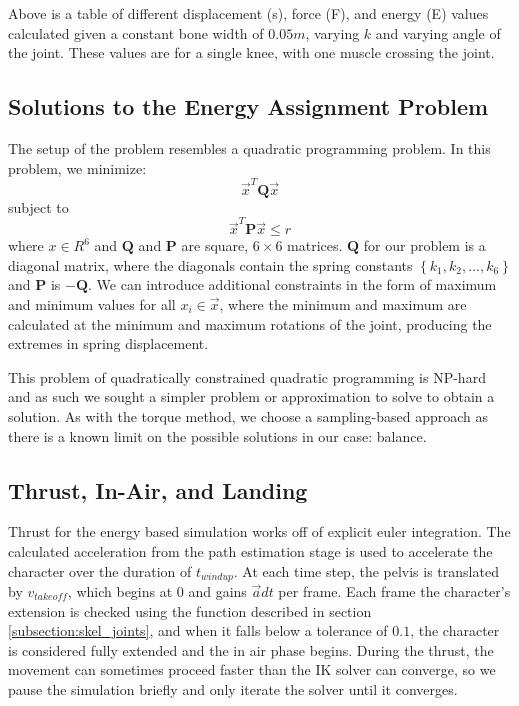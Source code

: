 \begin{table}[ht]
	\centering
	
	\caption[Table of estimated forces given $k$ values and joint angles]{Above is a table of different displacement (s), force (F), and energy (E) values calculated given a constant bone width of $0.05m$, varying $k$ and varying angle of the joint.  These values are for a single knee, with one muscle crossing the joint.}
	\label{tab:force_est}
\end{table}


\subsection{Solutions to the Energy Assignment Problem}
\label{subsection:energy_prob}
The setup of the problem resembles a quadratic programming problem.  In this problem, we minimize: \[ \vec{x}^T \mathbf{Q} \vec{x} \] subject to
\[ \vec{x}^T \mathbf{P} \vec{x} \le r \] where $x \in R^6$ and $\mathbf{Q}$ and $\mathbf{P}$ are square, $6 \times 6$ matrices.  $\mathbf{Q}$ for our problem is a diagonal matrix, where the diagonals contain the spring constants $\left\lbrace k_1, k_2, ... , k_6 \right\rbrace$ and $\mathbf{P}$ is $- \mathbf{Q}$.  We can introduce additional constraints in the form of maximum and minimum values for all $x_i \in \vec{x}$, where the minimum and maximum are calculated at the minimum and maximum rotations of the joint, producing the extremes in spring displacement.

This problem of quadratically constrained quadratic programming is NP-hard and as such we sought a simpler problem or approximation to solve to obtain a solution.  As with the torque method, we choose a sampling-based approach as there is a known limit on the possible solutions in our case: balance.  

\subsection{Thrust, In-Air, and Landing}
\label{subsection:energy_thrust}
Thrust for the energy based simulation works off of explicit euler integration.  The calculated acceleration from the path estimation stage is used to accelerate the character over the duration of $t_{windup}$.  At each time step, the pelvis is translated by $v_{takeoff}$, which begins at 0 and gains $\vec{a} dt$ per frame.  Each frame the character's extension is checked using the function described in section \ref{subsection:skel_joints}, and when it falls below a tolerance of $0.1$, the character is considered fully extended and the in air phase begins.  During the thrust, the movement can sometimes proceed faster than the IK solver can converge, so we pause the simulation briefly and only iterate the solver until it converges.

